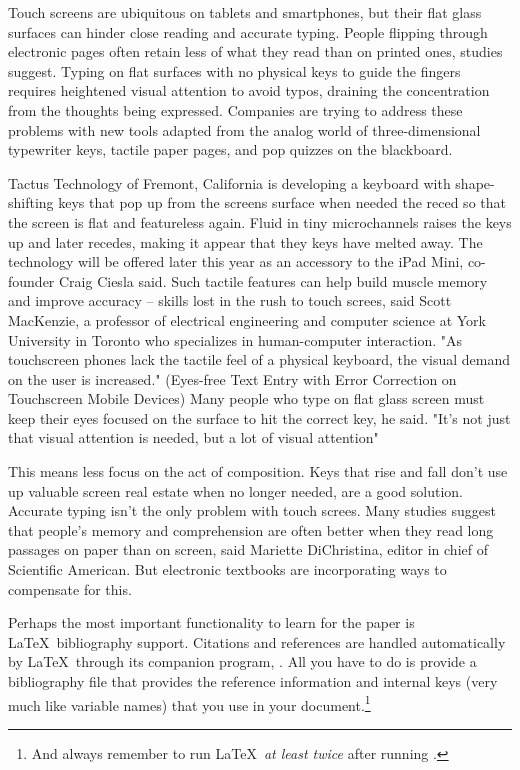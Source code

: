 \documentclass{article}
\begin{document}
Touch screens are ubiquitous on tablets and smartphones, but their flat glass surfaces can hinder close reading and accurate typing. People flipping through electronic pages often retain less of what they read than on printed ones, studies suggest. Typing on flat surfaces with no physical keys to guide the fingers requires heightened visual attention to avoid typos, draining the concentration from the thoughts being expressed. Companies are trying to address these problems with new tools adapted from the analog world of three-dimensional typewriter keys, tactile paper pages, and pop quizzes on the blackboard.

Tactus Technology of Fremont, California is developing a keyboard with shape-shifting keys that pop up from the screens surface when needed the reced so that the screen is flat and featureless again. Fluid in tiny microchannels raises the keys up and later recedes, making it appear that they keys have melted away. The technology will be offered later this year as an accessory to the iPad Mini, co-founder Craig Ciesla said. Such tactile features can help build muscle memory and improve accuracy -- skills lost in the rush to touch screes, said Scott MacKenzie, a professor of electrical engineering and computer science at York University in Toronto who specializes in human-computer interaction. "As touchscreen phones lack the tactile feel of a physical keyboard, the visual demand on the user is increased." (Eyes-free Text Entry with Error Correction on Touchscreen Mobile Devices) Many people who type on flat glass screen must keep their eyes focused on the surface to hit the correct key, he said. "It's not just that visual attention is needed, but a lot of visual attention"

This means less focus on the act of composition. Keys that rise and fall don't use up valuable screen real estate when no longer needed, are a good solution. Accurate typing isn't the only problem with touch screes. Many studies suggest that people's memory and comprehension are often better when they read long passages on paper than on screen, said Mariette DiChristina, editor in chief of Scientific American. But electronic textbooks are incorporating ways to compensate for this.

Perhaps the most important functionality to learn for the paper is \LaTeX\ bibliography support.  Citations and references are handled automatically by \LaTeX\ through its companion program, \BibTeX.  All you have to do is provide a bibliography file that provides the reference information and internal keys (very much like variable names) that you use in your document.\footnote{And always remember to run \LaTeX\ \emph{at least twice} after running \BibTeX.}
\end{document}
